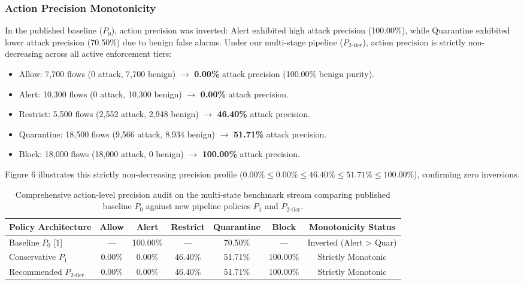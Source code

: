 \documentclass[journal,10pt,onecolumn]{IEEEtran}
\begin{document}
\subsubsection{Action Precision Monotonicity}
In the published baseline ($P_0$), action precision was inverted: Alert exhibited high attack precision (100.00\%), while Quarantine exhibited lower attack precision (70.50\%) due to benign false alarms. Under our multi-stage pipeline ($P_{2\text{-tier}}$), action precision is strictly non-decreasing across all active enforcement tiers:
\begin{itemize}
  \item Allow: 7,700 flows (0 attack, 7,700 benign) $\to$ \textbf{0.00\%} attack precision (100.00\% benign purity).
  \item Alert: 10,300 flows (0 attack, 10,300 benign) $\to$ \textbf{0.00\%} attack precision.
  \item Restrict: 5,500 flows (2,552 attack, 2,948 benign) $\to$ \textbf{46.40\%} attack precision.
  \item Quarantine: 18,500 flows (9,566 attack, 8,934 benign) $\to$ \textbf{51.71\%} attack precision.
  \item Block: 18,000 flows (18,000 attack, 0 benign) $\to$ \textbf{100.00\%} attack precision.
\end{itemize}

Figure 6 illustrates this strictly non-decreasing precision profile ($0.00\% \le 0.00\% \le 46.40\% \le 51.71\% \le 100.00\%$), confirming zero inversions.

\begin{table}[t]
\caption{Comprehensive action-level precision audit on the multi-state benchmark stream comparing published baseline $P_0$ against new pipeline policies $P_1$ and $P_{2\text{-tier}}$.}
\label{tab:action_precision}
\centering
\small
\begin{tabular}{lcccccc}
\toprule
\textbf{Policy Architecture} & \textbf{Allow} & \textbf{Alert} & \textbf{Restrict} & \textbf{Quarantine} & \textbf{Block} & \textbf{Monotonicity Status} \\
\midrule
Baseline $P_0$ [1] & --- & 100.00\% & --- & 70.50\% & --- & Inverted (Alert > Quar) \\
Conservative $P_1$ & 0.00\% & 0.00\% & 46.40\% & 51.71\% & 100.00\% & Strictly Monotonic \\
Recommended $P_{2\text{-tier}}$ & 0.00\% & 0.00\% & 46.40\% & 51.71\% & 100.00\% & Strictly Monotonic \\
\bottomrule
\end{tabular}
\end{table}
\end{document}
